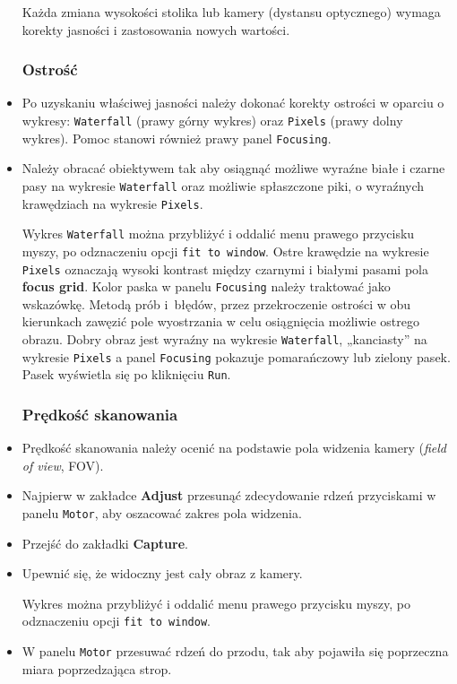 \documentclass[
  letterpaper,
  DIV=11,
  numbers=noendperiod]{scrreprt}
\begin{document}
\begin{itemize}
  Każda zmiana wysokości stolika lub kamery (dystansu optycznego) wymaga
  korekty jasności i zastosowania nowych wartości.

  \hypertarget{ostroux15bux107}{%
  \subsubsection{Ostrość}\label{ostroux15bux107}}
\item
  Po uzyskaniu właściwej jasności należy dokonać korekty ostrości w
  oparciu o wykresy: \texttt{Waterfall} (prawy górny wykres) oraz
  \texttt{Pixels} (prawy dolny wykres). Pomoc stanowi również prawy
  panel \texttt{Focusing}.
\item
  Należy obracać obiektywem tak aby osiągnąć możliwe wyraźne białe i
  czarne pasy na wykresie \texttt{Waterfall} oraz możliwie spłaszczone
  piki, o wyraźnych krawędziach na wykresie \texttt{Pixels}.

  Wykres \texttt{Waterfall} można przybliżyć i oddalić menu prawego
  przycisku myszy, po odznaczeniu opcji \texttt{fit\ to\ window}. Ostre
  krawędzie na wykresie \texttt{Pixels} oznaczają wysoki kontrast między
  czarnymi i białymi pasami pola \textbf{focus grid}. Kolor paska w
  panelu \texttt{Focusing} należy traktować jako wskazówkę. Metodą prób
  i~błędów, przez przekroczenie ostrości w obu kierunkach zawęzić pole
  wyostrzania w celu osiągnięcia możliwie ostrego obrazu. Dobry obraz
  jest wyraźny na wykresie \texttt{Waterfall}, „kanciasty'' na wykresie
  \texttt{Pixels} a panel \texttt{Focusing} pokazuje pomarańczowy lub
  zielony pasek. Pasek wyświetla się po kliknięciu \texttt{Run}.

  \hypertarget{prux119dkoux15bux107-skanowania}{%
  \subsubsection{Prędkość
  skanowania}\label{prux119dkoux15bux107-skanowania}}
\item
  Prędkość skanowania należy ocenić na podstawie pola widzenia kamery
  (\emph{field of view}, FOV).
\item
  Najpierw w zakładce \textbf{Adjust} przesunąć zdecydowanie rdzeń
  przyciskami w panelu \texttt{Motor}, aby oszacować zakres pola
  widzenia.
\item
  Przejść do zakładki \textbf{Capture}.
\item
  Upewnić się, że widoczny jest cały obraz z kamery.

  Wykres można przybliżyć i oddalić menu prawego przycisku myszy, po
  odznaczeniu opcji \texttt{fit\ to\ window}.
\item
  W panelu \texttt{Motor} przesuwać rdzeń do przodu, tak aby pojawiła
  się poprzeczna miara poprzedzająca strop.


\end{itemize}
\end{document}
